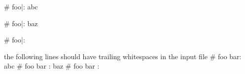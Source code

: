 # foo\bar:
  abc

# foo\bar: baz

# foo\bar:

the following lines should have trailing whitespaces in the input file                
# foo bar:                         
  abc                         
# foo bar : baz                         
# foo bar :                         
